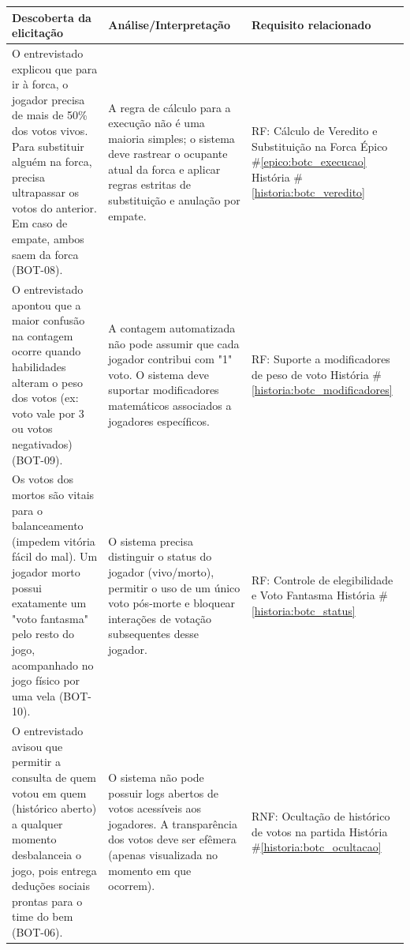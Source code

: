 \documentclass[12pt,a4paper]{article}
\newcounter{epico}
\newcounter{historia}
\begin{document}
\begin{longtable}{|p{7cm}|p{4.5cm}|p{4.5cm}|}
    \hline
    \rowcolor[gray]{0.9}
    \textbf{Descoberta da elicitação} &
    \textbf{Análise/Interpretação} &
    \textbf{Requisito relacionado} \\
    \hline

    O entrevistado explicou que para ir à forca, o jogador precisa de mais de 50\% dos votos vivos. Para substituir alguém na forca, precisa ultrapassar os votos do anterior. Em caso de empate, ambos saem da forca (BOT-08).
    & A regra de cálculo para a execução não é uma maioria simples; o sistema deve rastrear o ocupante atual da forca e aplicar regras estritas de substituição e anulação por empate.
    & RF: Cálculo de Veredito e Substituição na Forca
    \newline \newline Épico \#\ref{epico:botc_execucao} 
    \newline História \#\ref{historia:botc_veredito} \\
    
    \hline
    
    O entrevistado apontou que a maior confusão na contagem ocorre quando habilidades alteram o peso dos votos (ex: voto vale por 3 ou votos negativados) (BOT-09).
    & A contagem automatizada não pode assumir que cada jogador contribui com "1" voto. O sistema deve suportar modificadores matemáticos associados a jogadores específicos.
    & RF: Suporte a modificadores de peso de voto
    \newline \newline História \#\ref{historia:botc_modificadores} \\
    
    \hline
    
    Os votos dos mortos são vitais para o balanceamento (impedem vitória fácil do mal). Um jogador morto possui exatamente um "voto fantasma" pelo resto do jogo, acompanhado no jogo físico por uma vela (BOT-10).
    & O sistema precisa distinguir o status do jogador (vivo/morto), permitir o uso de um único voto pós-morte e bloquear interações de votação subsequentes desse jogador.
    & RF: Controle de elegibilidade e Voto Fantasma
    \newline \newline História \#\ref{historia:botc_status} \\
    
    \hline
    
    O entrevistado avisou que permitir a consulta de quem votou em quem (histórico aberto) a qualquer momento desbalanceia o jogo, pois entrega deduções sociais prontas para o time do bem (BOT-06).
    & O sistema não pode possuir logs abertos de votos acessíveis aos jogadores. A transparência dos votos deve ser efêmera (apenas visualizada no momento em que ocorrem).
    & RNF: Ocultação de histórico de votos na partida
    \newline \newline História \#\ref{historia:botc_ocultacao} \\


\end{longtable}
\end{document}
